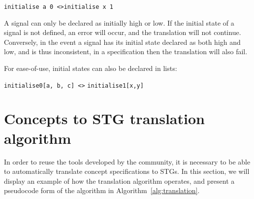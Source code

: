\documentclass[british,conference,compsoc]{IEEEtran}
\begin{document}
\begin{center}
   \texttt{initialise a 0 <>}\texttt{initialise x 1}
\end{center}

\noindent A signal can only be declared as initially high or low. If the 
initial state of a signal is not defined, an error will occur, and the 
translation will not continue. Conversely, in the event a signal has its 
initial state declared as both high and low, and is thus inconsistent, in a 
specification then the translation will also fail.

For ease-of-use, initial states can also be declared in lists:

\begin{center}
\texttt{initialise0[a, b, c] <>} \texttt{initialise1[x,y]}
\end{center}

\vspace{-2mm}

\section{Concepts to STG translation algorithm\label{sec:algorithm}}

\vspace{-2mm}

In order to reuse the tools developed by the community, it is
necessary to be able to automatically translate concept specifications to STGs.
In this section, we will display an example of how the translation algorithm 
operates, and present a pseudocode form of the algorithm in 
Algorithm~\ref{alg:translation}. 
\end{document}
